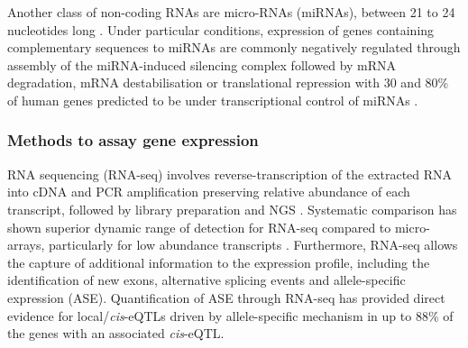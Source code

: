 Another class of non-coding RNAs are micro-RNAs (miRNAs), between 21 to 24 nucleotides long \parencite{Lee2002}. Under particular conditions, expression of genes containing complementary sequences to miRNAs are commonly negatively regulated through assembly of the miRNA-induced silencing complex followed by mRNA degradation, mRNA destabilisation or translational repression with 30 and 80\% of human genes predicted to be under transcriptional control of miRNAs \parencite{Ameres2010,Braun2011,Petersen2006,Lewis2005, Friedman2008}. %




\subsubsection{Methods to assay gene expression}
RNA sequencing (RNA-seq) involves reverse-transcription of the extracted RNA into cDNA and PCR amplification preserving relative abundance of each transcript, followed by library preparation and NGS \parencite{Mortazavi2008}. Systematic comparison has shown superior dynamic range of detection for RNA-seq compared to micro-arrays, particularly for low abundance transcripts \parencite{Zhao2014}. Furthermore, RNA-seq allows the capture of additional information to the expression profile, including the identification of new exons, alternative splicing events and allele-specific expression (ASE). 
Quantification of ASE through RNA-seq has provided direct evidence for local/\textit{cis}-eQTLs driven by allele-specific mechanism in up to 88\% of the genes with an associated \textit{cis}-eQTL\parencite{Yan2002,Pickrell2010}.%

